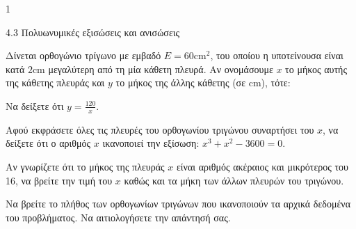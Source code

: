 \begin{ylh}{1}
\item 4.3 Πολυωνυμικές εξισώσεις και ανισώσεις
\end{ylh}
Δίνεται ορθογώνιο τρίγωνο με εμβαδό $E = 60\text{cm}^2$, του οποίου η υποτείνουσα είναι κατά $2\text{cm}$ μεγαλύτερη από τη μία κάθετη πλευρά. Αν ονομάσουμε $x$ το μήκος αυτής της κάθετης πλευράς και $y$ το μήκος της άλλης κάθετης (σε $\text{cm}$), τότε:
\begin{alist}
\item
\end{alist}
\begin{alist}
\item
  Να δείξετε ότι $y = \frac{120}{x}$.
\end{alist}
\begin{alist}
\item
  Αφού εκφράσετε όλες τις πλευρές του ορθογωνίου τριγώνου συναρτήσει του $x$, να δείξετε ότι ο αριθμός $x$ ικανοποιεί την εξίσωση:
$x^3 + x^2 - 3600 = 0$.
\item Αν γνωρίζετε ότι το μήκος της πλευράς $x$ είναι αριθμός ακέραιος και μικρότερος του 16, να βρείτε την τιμή του $x$ καθώς και τα μήκη των άλλων πλευρών του τριγώνου.
\item Να βρείτε το πλήθος των ορθογωνίων τριγώνων που ικανοποιούν τα αρχικά δεδομένα του προβλήματος. Να αιτιολογήσετε την απάντησή σας.
\end{alist}

